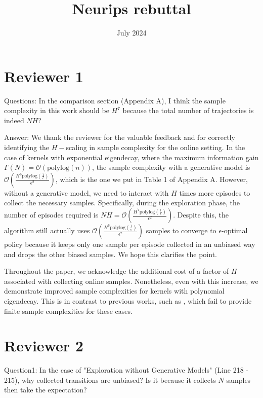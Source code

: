 \documentclass{article}
\title{Neurips rebuttal}
\date{July 2024}
\begin{document}
\maketitle

\section*{Reviewer 1}

Questions: In the comparison section (Appendix A), I think the sample complexity in this work should be $H^7$
 because the total number of trajectories is indeed $NH$?

Answer: We thank the reviewer for the valuable feedback and for correctly identifying the $H-$scaling in sample complexity for the online setting. In the case of kernels with exponential eigendecay, where the maximum information gain $\Gamma(N) = \mathcal{O}(\text{polylog}(n))$, the sample complexity with a generative model is $\mathcal{O}\left(\frac{H^6 \text{polylog}\left(\frac{1}{\epsilon}\right)}{\epsilon^2}\right)$, which is the one we put in Table 1 of Appendix A. However, without a generative model, we need to interact with $H$ times more episodes to collect the necessary samples. Specifically, during the exploration phase, the number of episodes required is $NH = \mathcal{O}\left(\frac{H^7 \text{polylog}\left(\frac{1}{\epsilon}\right)}{\epsilon^2}\right)$. Despite this, the algorithm still actually uses $\mathcal{O}\left(\frac{H^6 \text{polylog}\left(\frac{1}{\epsilon}\right)}{\epsilon^2}\right)$ samples to converge to $\epsilon$-optimal policy because it keeps only one sample per episode collected in an unbiased way and drops the other biased samples. We hope this clarifies the point.

Throughout the paper, we acknowledge the additional cost of a factor of $H$ associated with collecting online samples. Nonetheless, even with this increase, we demonstrate improved sample complexities for kernels with polynomial eigendecay. This is in contrast to previous works, such as \cite{qiu2021reward}, which fail to provide finite sample complexities for these cases. 

\section*{Reviewer 2}
Question1: In the case of "Exploration without Generative Models" (Line 218 - 215), why collected transitions are unbiased? Is it because it collects $N$ samples then take the expectation?
\end{document}
